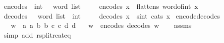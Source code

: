 \begin{isabellebody}
\isanewline
{}\isamarkupfalse%
\ encode{\isacharunderscore}{\kern0pt}s{}{}\ {\isacharcolon}{\kern0pt}{\isacharcolon}{\kern0pt}\ {\isachardoublequoteopen}int\ {\isasymRightarrow}\ {}\ word\ list{\isachardoublequoteclose}\isanewline
\ \ \isanewline
\ \ {\isachardoublequoteopen}encode{\isacharunderscore}{\kern0pt}s{}{}\ x\ {\isasymequiv}\ flatten{\isacharunderscore}{\kern0pt}s{}{}\ {\isacharparenleft}{\kern0pt}word{\isacharunderscore}{\kern0pt}of{\isacharunderscore}{\kern0pt}int\ x{\isacharparenright}{\kern0pt}{\isachardoublequoteclose}\isanewline
\isanewline
{}\isamarkupfalse%
\ decode{\isacharunderscore}{\kern0pt}s{}{}\ {\isacharcolon}{\kern0pt}{\isacharcolon}{\kern0pt}\ {\isachardoublequoteopen}{}\ word\ list\ {\isasymRightarrow}\ int{\isachardoublequoteclose}\isanewline
\ \ \isanewline
\ \ {\isachardoublequoteopen}decode{\isacharunderscore}{\kern0pt}s{}{}\ x\ {\isasymequiv}\ sint\ {\isacharparenleft}{\kern0pt}cat{\isacharunderscore}{\kern0pt}s{}{}\ x{\isacharparenright}{\kern0pt}{\isachardoublequoteclose}\isanewline
\isanewline
{}\isamarkupfalse%
\ encode{\isacharunderscore}{\kern0pt}decode{\isacharunderscore}{\kern0pt}s{}{}{\isacharcolon}{\kern0pt}\isanewline
\ \ \ {\isachardoublequoteopen}w\ {\isacharequal}{\kern0pt}\ {\isacharbrackleft}{\kern0pt}a{}{\isacharcomma}{\kern0pt}\ a{}{\isacharcomma}{\kern0pt}\ b{}{\isacharcomma}{\kern0pt}\ b{}{\isacharcomma}{\kern0pt}\ c{}{\isacharcomma}{\kern0pt}\ c{}{\isacharcomma}{\kern0pt}\ d{}{\isacharcomma}{\kern0pt}\ d{}{\isacharbrackright}{\kern0pt}{\isachardoublequoteclose}\isanewline
\ \ \ {\isachardoublequoteopen}w\ {\isacharequal}{\kern0pt}\ encode{\isacharunderscore}{\kern0pt}s{}{}\ {\isacharparenleft}{\kern0pt}decode{\isacharunderscore}{\kern0pt}s{}{}\ w{\isacharparenright}{\kern0pt}{\isachardoublequoteclose}\isanewline
%
\isadelimproof
\ \ %
\endisadelimproof
%
\isatagproof
{}\isamarkupfalse%
\ assms\ \isanewline
\ \ \isamarkupfalse%
\ {\isacharparenleft}{\kern0pt}simp\ add{\isacharcolon}{\kern0pt}\ rsplit{\isacharunderscore}{\kern0pt}rcat{\isacharunderscore}{\kern0pt}eq{\isacharparenright}{\kern0pt}%
\endisatagproof

\end{isabellebody}
